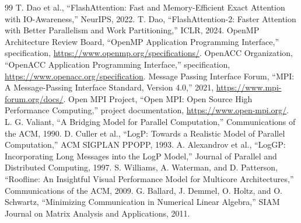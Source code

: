 \documentclass[11pt]{article}
\begin{document}
\begin{thebibliography}{99}
 T. Dao et al., ``FlashAttention: Fast and Memory-Efficient Exact Attention with IO-Awareness,'' NeurIPS, 2022.
 T. Dao, ``FlashAttention-2: Faster Attention with Better Parallelism and Work Partitioning,'' ICLR, 2024.
 OpenMP Architecture Review Board, ``OpenMP Application Programming Interface,'' specification, \url{https://www.openmp.org/specifications/}.
 OpenACC Organization, ``OpenACC Application Programming Interface,'' specification, \url{https://www.openacc.org/specification}.
 Message Passing Interface Forum, ``MPI: A Message-Passing Interface Standard, Version 4.0,'' 2021, \url{https://www.mpi-forum.org/docs/}.
 Open MPI Project, ``Open MPI: Open Source High Performance Computing,'' project documentation, \url{https://www.open-mpi.org/}.
 L. G. Valiant, ``A Bridging Model for Parallel Computation,'' Communications of the ACM, 1990.
 D. Culler et al., ``LogP: Towards a Realistic Model of Parallel Computation,'' ACM SIGPLAN PPOPP, 1993.
 A. Alexandrov et al., ``LogGP: Incorporating Long Messages into the LogP Model,'' Journal of Parallel and Distributed Computing, 1997.
 S. Williams, A. Waterman, and D. Patterson, ``Roofline: An Insightful Visual Performance Model for Multicore Architectures,'' Communications of the ACM, 2009.
 G. Ballard, J. Demmel, O. Holtz, and O. Schwartz, ``Minimizing Communication in Numerical Linear Algebra,'' SIAM Journal on Matrix Analysis and Applications, 2011.
\end{thebibliography}
\end{document}

